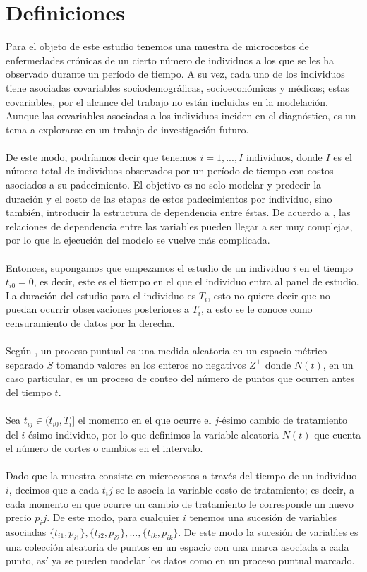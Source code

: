\section{Definiciones}
Para el objeto de este estudio tenemos una muestra de microcostos de enfermedades cr\'onicas de un cierto n\'umero de individuos a los que se les ha observado durante un per\'iodo de tiempo. A su vez, cada uno de los individuos tiene asociadas covariables sociodemogr\'aficas, socioecon\'omicas y m\'edicas; estas covariables, por el alcance del trabajo no est\'an incluidas en la modelaci\'on. Aunque las covariables asociadas a los individuos inciden en el diagn\'ostico, es un tema a explorarse en un trabajo de investigaci\'on futuro.\\
\\
De este modo, podr\'iamos decir que tenemos $i=1,...,I$ individuos, donde $I$ es el n\'umero total de individuos observados por un per\'iodo de tiempo con costos asociados a su padecimiento. El objetivo es no solo modelar y predecir la duraci\'on y el costo de las etapas de estos padecimientos por individuo, sino tambi\'en, introducir la estructura de dependencia entre \'estas. De acuerdo a \cite{daley2003}, las relaciones de dependencia entre las variables pueden llegar a ser muy complejas, por lo que la ejecuci\'on del modelo se vuelve m\'as complicada.\\ 
\\
Entonces, supongamos que empezamos el estudio de un individuo $i$ en el tiempo $t_{i0}=0$, es decir, este es el tiempo en el que el individuo entra al panel de estudio. La duraci\'on del estudio para el individuo es $T_i$, esto no quiere decir que no puedan ocurrir observaciones posteriores a $T_i$, a esto se le conoce como censuramiento de datos por la derecha.\\
\\
Seg\'un \cite{intropp}, un proceso puntual es una medida aleatoria en un espacio m\'etrico separado $S$ tomando valores en los enteros no negativos $Z^+$ donde $N(t)$, en un caso particular, es un proceso de conteo del n\'umero de puntos que ocurren antes del tiempo $t$.\\
\\
Sea $t_{ij} \in (t_{i0},T_i]$ el momento en el que ocurre el $j$-\'esimo cambio de tratamiento del $i$-\'esimo individuo, por lo que definimos la variable aleatoria $N(t)$ que cuenta el n\'umero de cortes o cambios en el intervalo.\\
\\
Dado que la muestra consiste en microcostos a trav\'es del tiempo de un individuo $i$, decimos que a cada $t_ij$ se le asocia la variable costo de tratamiento; es decir, a cada momento en que ocurre un cambio de tratamiento le corresponde un nuevo precio $p_ij$. De este modo, para cualquier $i$ tenemos una sucesi\'on de variables asociadas $\{t_{i1},p_{i1}\},\{t_{i2},p_{i2}\},...,\{t_{ik},p_{ik}\}$. De este modo la sucesi\'on de variables es una colecci\'on aleatoria de puntos en un espacio con una marca asociada a cada punto, as\'i ya se pueden modelar los datos como en un proceso puntual marcado.\\
